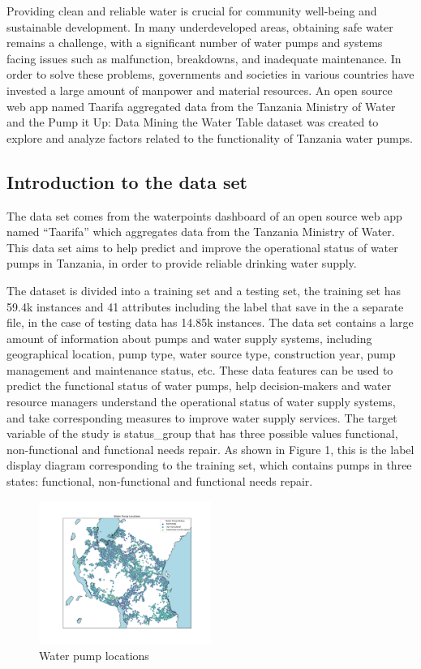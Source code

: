 \documentclass[conference]{IEEEtran}
\begin{document}
Providing clean and reliable water is crucial for community well-being and sustainable development. In many underdeveloped areas, obtaining safe water remains a challenge, with a significant number of water pumps and systems facing issues such as malfunction, breakdowns, and inadequate maintenance. In order to solve these problems, governments and societies in various countries have invested a large amount of manpower and material resources. An open source web app named Taarifa aggregated data from the Tanzania Ministry of Water and the Pump it Up: Data Mining the Water Table dataset was created to explore and analyze factors related to the functionality of Tanzania water pumps.

\subsection{Introduction to the data set}

The data set comes from the waterpoints dashboard of an open source web app named “Taarifa” which aggregates data from the Tanzania Ministry of Water. This data set aims to help predict and improve the operational status of water pumps in Tanzania, in order to provide reliable drinking water supply. 

The dataset is divided into a training set and a testing set, the training set has 59.4k instances and 41 attributes including the label that save in the a separate file, in the case of testing data has 14.85k instances. The data set contains a large amount of information about pumps and water supply systems, including geographical location, pump type, water source type, construction year, pump management and maintenance status, etc. These data features can be used to predict the functional status of water pumps, help decision-makers and water resource managers understand the operational status of water supply systems, and take corresponding measures to improve water supply services. The target variable of the study is status\_group that has three possible values functional, non-functional and functional needs repair. As shown in Figure 1, this is the label display diagram corresponding to the training set, which contains pumps in three states: functional, non-functional and functional needs repair.

\begin{figure}[htbp]
\centerline{\includegraphics[width=0.5\textwidth]{introduction.pic.jpg}}
\caption{Water pump locations}
\end{figure}
\end{document}
